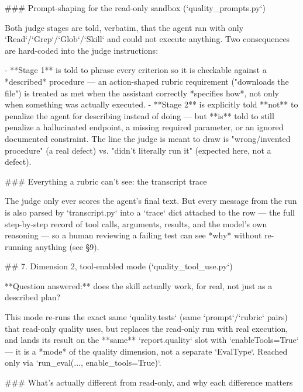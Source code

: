 ### Prompt-shaping for the read-only sandbox (`quality_prompts.py`)

Both judge stages are told, verbatim, that the agent ran with only `Read`/`Grep`/`Glob`/`Skill` and could not execute anything. Two consequences are hard-coded into the judge instructions:

- **Stage 1** is told to phrase every criterion so it is checkable against a *described* procedure — an action-shaped rubric requirement ("downloads the file") is treated as met when the assistant correctly *specifies how*, not only when something was actually executed.
- **Stage 2** is explicitly told **not** to penalize the agent for describing instead of doing — but **is** told to still penalize a hallucinated endpoint, a missing required parameter, or an ignored documented constraint. The line the judge is meant to draw is "wrong/invented procedure" (a real defect) vs. "didn't literally run it" (expected here, not a defect).

### Everything a rubric can't see: the transcript trace

The judge only ever scores the agent's final text. But every message from the run is also parsed by `transcript.py` into a `trace` dict attached to the row — the full step-by-step record of tool calls, arguments, results, and the model's own reasoning — so a human reviewing a failing test can see *why* without re-running anything (see §9).

## 7. Dimension 2, tool-enabled mode (`quality_tool_use.py`)

**Question answered:** does the skill actually work, for real, not just as a described plan?

This mode re-runs the exact same `quality.tests` (same `prompt`/`rubric` pairs) that read-only quality uses, but replaces the read-only run with real execution, and lands its result on the **same** `report.quality` slot with `enableTools=True` — it is a *mode* of the quality dimension, not a separate `EvalType`. Reached only via `run_eval(..., enable_tools=True)`.

### What's actually different from read-only, and why each difference matters

